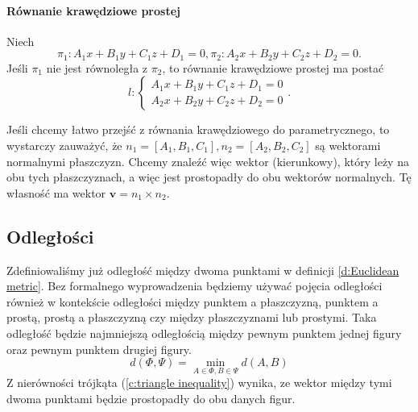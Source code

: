 \paragraph{Równanie krawędziowe prostej} Niech
\[ \pi_1 : A_1x + B_1y + C_1z + D_1 = 0, \pi_2 : A_2x + B_2y + C_2z + D_2 = 0. \]
Jeśli $\pi_1$ nie jest równoległa z $\pi_2$, to równanie krawędziowe prostej ma postać
\begin{equation}
    l : \begin{cases}
        A_1x + B_1y + C_1z + D_1 = 0 \\
        A_2x + B_2y + C_2z + D_2 = 0
    \end{cases}.
\end{equation}

\begin{remark*}
    Jeśli chcemy łatwo przejść z równania krawędziowego do parametrycznego, to wystarczy zauważyć, że $n_1 = [A_1, B_1, C_1], n_2 = [A_2, B_2, C_2]$ są wektorami normalnymi płaszczyzn. Chcemy znaleźć więc wektor (kierunkowy), który leży na obu tych płaszczyznach, a więc jest prostopadły do obu wektorów normalnych. Tę własność ma wektor $\mathbf{v} = n_1 \times n_2$.
\end{remark*}

\subsection{Odległości}
Zdefiniowaliśmy już odległość między dwoma punktami w definicji \ref{d:Euclidean metric}. Bez formalnego wyprowadzenia będziemy używać pojęcia odległości również w kontekście odległości między punktem a płaszczyzną, punktem a prostą, prostą a płaszczyzną czy między płaszczyznami lub prostymi. Taka odległość będzie najmniejszą odległością między pewnym punktem jednej figury oraz pewnym punktem drugiej figury.
\[ d(\Phi, \Psi) = \min_{A \in \Phi, B \in \Psi} d(A, B) \]
Z nierówności trójkąta (\ref{c:triangle inequality}) wynika, ze wektor między tymi dwoma punktami będzie prostopadły do obu danych figur.

